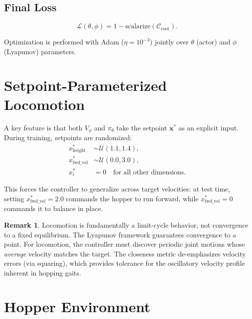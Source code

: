 \documentclass[11pt]{article}
\newcommand{\xstar}{\bm{x}^*}
\theoremstyle{definition}
\newtheorem{remark}{Remark}
\begin{document}
\subsection{Final Loss}

\[
    \mathcal{L}(\theta, \phi) = 1 - \text{scalarize}(\mathcal{C}_{\text{root}}).
\]

Optimization is performed with Adam ($\eta = 10^{-3}$) jointly over
$\theta$ (actor) and $\phi$ (Lyapunov) parameters.

\section{Setpoint-Parameterized Locomotion}

A key feature is that both $V_\phi$ and $\pi_\theta$ take the setpoint
$\xstar$ as an explicit input.  During training, setpoints are randomized:
\begin{align}
    x^*_{\text{height}} &\sim \mathcal{U}(1.1, 1.4), \\
    x^*_{\text{fwd\_vel}} &\sim \mathcal{U}(0.0, 3.0), \\
    x^*_i &= 0 \quad \text{for all other dimensions}.
\end{align}

This forces the controller to generalize across target velocities: at test
time, setting $x^*_{\text{fwd\_vel}} = 2.0$ commands the hopper to run forward,
while $x^*_{\text{fwd\_vel}} = 0$ commands it to balance in place.

\begin{remark}
Locomotion is fundamentally a limit-cycle behavior, not convergence to a
fixed equilibrium.  The Lyapunov framework guarantees convergence to a point.
For locomotion, the controller must discover periodic joint motions whose
\emph{average} velocity matches the target.  The closeness metric
de-emphasizes velocity errors (via squaring), which provides tolerance for
the oscillatory velocity profile inherent in hopping gaits.
\end{remark}

\section{Hopper Environment}
\end{document}
